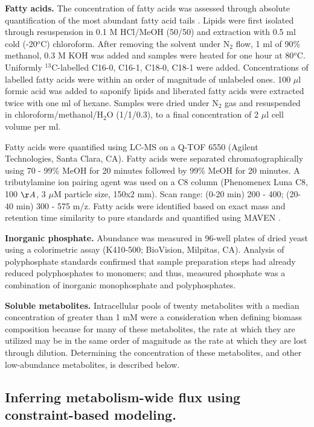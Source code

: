\textbf{Fatty acids.} The concentration of fatty acids was assessed through absolute quantification of the most abundant fatty acid tails \cite{Pramanik:1997ja}.  Lipids were first isolated through resuspension in 0.1 M HCl/MeOH (50/50) and extraction with 0.5 ml cold (-20$^{o}$C) chloroform.  After removing the solvent under N$_{2}$ flow, 1 ml of 90\% methanol, 0.3 M KOH was added and samples were heated for one hour at 80$^{o}$C.  Uniformly $^{13}$C-labelled C16-0, C16-1, C18-0, C18-1 were added.  Concentrations of labelled fatty acids were within an order of magnitude of unlabeled ones.  100 $\mu$l formic acid was added to saponify lipids and liberated fatty acids were extracted twice with one ml of hexane.  Samples were dried under N$_{2}$ gas and resuspended in chloroform/methanol/H$_{2}$O (1/1/0.3), to a final concentration of 2 $\mu$l cell volume per ml.

Fatty acids were quantified using LC-MS on a Q-TOF 6550 (Agilent Technologies, Santa Clara, CA).  Fatty acids were separated chromatographically using 70 - 99\% MeOH for 20 minutes followed by 99\% MeOH for 20 minutes.  A tributylamine ion pairing agent was used on a C8 column (Phenomenex Luna C8, 100 $\AA$, 3 $\mu$M particle size, 150x2 mm).  Scan range: (0-20 min) 200 - 400; (20-40 min) 300 - 575 m/z.  Fatty acids were identified based on exact mass and retention time similarity to pure standards and quantified using MAVEN \cite{Melamud:2010bp}.  

\textbf{Inorganic phosphate.} Abundance was measured in 96-well plates of dried yeast using a colorimetric assay (K410-500; BioVision, Milpitas, CA).  Analysis of polyphosphate standards confirmed that sample preparation steps had already reduced polyphosphates to monomers; and thus, measured phosphate was a combination of inorganic monophosphate and polyphosphates.

\textbf{Soluble metabolites.} Intracellular pools of twenty metabolites with a median concentration of greater than 1 mM were a consideration when defining biomass composition because for many of these metabolites, the rate at which they are utilized may be in the same order of magnitude as the rate at which they are lost through dilution.  Determining the concentration of these metabolites, and other low-abundance metabolites, is described below.

\subsection*{Inferring metabolism-wide flux using constraint-based modeling.}

